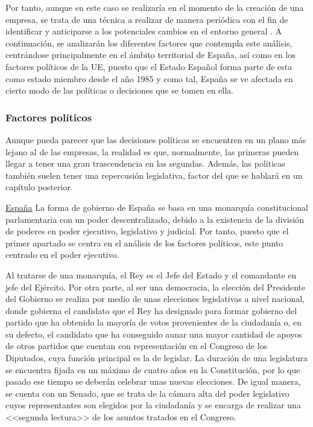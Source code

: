 Por tanto, aunque en este caso se realizaría en el momento de la creación de una empresa, se trata de una técnica a realizar de manera periódica con el fin de identificar y anticiparse a los potenciales cambios en el entorno general \cite{jedidiagarciallergo2012}. A continuación, se analizarán los diferentes factores que contempla este análisis, centrándose principalmente en el ámbito territorial de España, así como en los factores políticos de la \acf{UE}, puesto que el Estado Español forma parte de esta como estado miembro desde el año 1985 y como tal, España se ve afectada en cierto modo de las políticas o decisiones que se tomen en ella. 

\subsubsection{Factores políticos}
Aunque pueda parecer que las decisiones políticas se encuentren en un plano más lejano al de las empresas, la realidad es que, normalmente, las primeras pueden llegar a tener una gran trascendencia en las segundas. Además, las políticas también suelen tener una repercusión legislativa, factor del que se hablará en un capítulo posterior.

\noindent\underline{España}\newline
\indent La forma de gobierno de España \cite{santandertrade} se basa en una monarquía constitucional parlamentaria con un poder descentralizado, debido a la existencia de la división de poderes en poder ejecutivo, legislativo y judicial. Por tanto, puesto que el primer apartado se centra en el análisis de los factores políticos, este punto centrado en el poder ejecutivo.

Al tratarse de una monarquía, el Rey es el Jefe del Estado y el comandante en jefe del Ejército. Por otra parte, al ser una democracia, la elección del Presidente del Gobierno se realiza por medio de unas elecciones legislativas a nivel nacional, donde gobierna el candidato que el Rey ha designado para formar gobierno del partido que ha obtenido la mayoría de votos provenientes de la ciudadanía o, en su defecto, el candidato que ha conseguido aunar una mayor cantidad de apoyos de otros partidos que cuentan con representación en el Congreso de los Diputados, cuya función principal es la de legislar. La duración de una legislatura se encuentra fijada en un máximo de cuatro años en la Constitución, por lo que pasado ese tiempo se deberán celebrar unas nuevas elecciones. De igual manera, se cuenta con un Senado, que se trata de la cámara alta del poder legislativo cuyos representantes son elegidos por la ciudadanía y se encarga de realizar una <<segunda lectura>> de los asuntos tratados en el Congreso.

